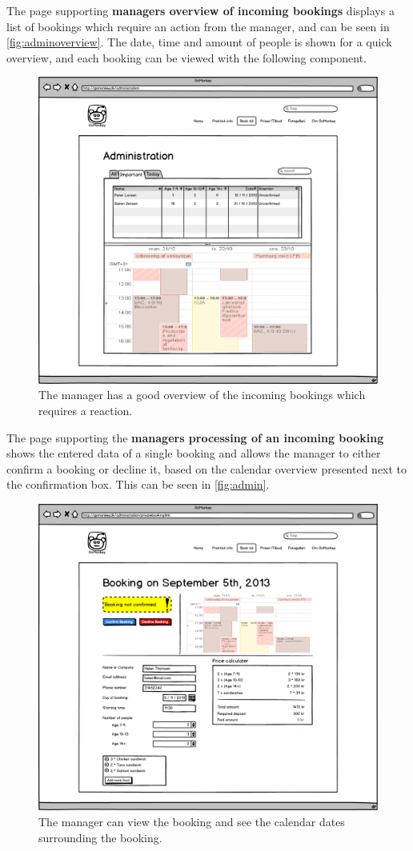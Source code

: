 \FloatBarrier
\newpage

The page supporting \textbf{managers overview of incoming bookings} displays a list of bookings which require an 
action from the manager, and can be seen in \autoref{fig:adminoverview}. The 
date, time and amount of people is shown for a quick overview, and each booking can be viewed with the following 
component.

\begin{figure}[htbp]
    \centering
        \includegraphics[width=.6\textwidth]{figures/mockup/overview_important.png}
	    \caption{The manager has a good overview of the incoming bookings which requires a reaction.}
        \label{fig:adminoverview}
\end{figure}

\FloatBarrier
\newpage


The page supporting the \textbf{managers processing of an incoming booking} shows the entered data of
a single booking and allows the
\gomonkey{} manager to either confirm a booking or decline it, based on the 
calendar overview presented next to the confirmation box. This can be seen in
\autoref{fig:admin}. 

\begin{figure}[htbp]
    \centering
        \includegraphics[width=.6\textwidth]{figures/mockup/admin_booking.png}
	    \caption{The manager can view the booking and see the calendar dates surrounding the booking.}
        \label{fig:admin}
\end{figure}

